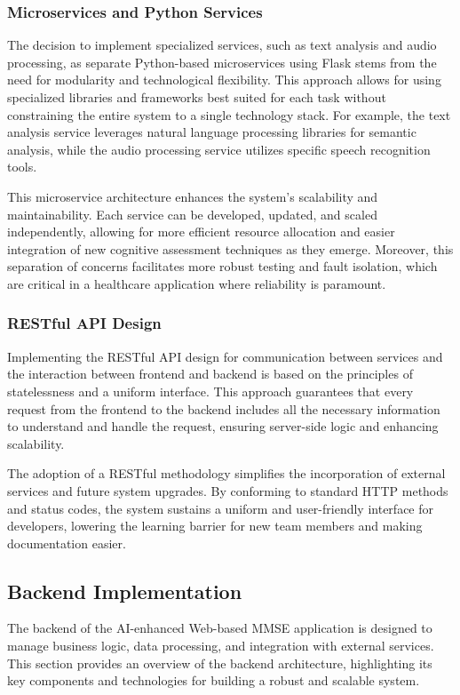 \subsubsection{Microservices and Python Services}
The decision to implement specialized services, such as text analysis and audio processing, as separate Python-based microservices using Flask stems from the need for modularity and technological flexibility. This approach allows for using specialized libraries and frameworks best suited for each task without constraining the entire system to a single technology stack. For example, the text analysis service leverages natural language processing libraries for semantic analysis, while the audio processing service utilizes specific speech recognition tools.

This microservice architecture enhances the system's scalability and maintainability. Each service can be developed, updated, and scaled independently, allowing for more efficient resource allocation and easier integration of new cognitive assessment techniques as they emerge. Moreover, this separation of concerns facilitates more robust testing and fault isolation, which are critical in a healthcare application where reliability is paramount.

\subsubsection{RESTful API Design}
Implementing the RESTful API design for communication between services and the interaction between frontend and backend is based on the principles of statelessness and a uniform interface. This approach guarantees that every request from the frontend to the backend includes all the necessary information to understand and handle the request, ensuring server-side logic and enhancing scalability.

The adoption of a RESTful methodology simplifies the incorporation of external services and future system upgrades. By conforming to standard HTTP methods and status codes, the system sustains a uniform and user-friendly interface for developers, lowering the learning barrier for new team members and making documentation easier.

\subsection{Backend Implementation}
The backend of the AI-enhanced Web-based MMSE application is designed to manage business logic, data processing, and integration with external services. This section provides an overview of the backend architecture, highlighting its key components and technologies for building a robust and scalable system.


